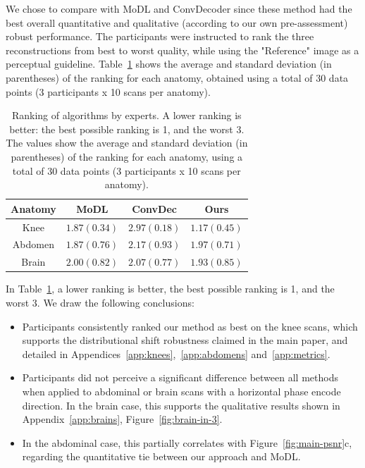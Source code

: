 \documentclass{article}
\begin{document}
We chose to compare with MoDL and ConvDecoder since these method had the best overall quantitative and qualitative (according to our own pre-assessment) robust performance. The participants were instructed to rank the three reconstructions from best to worst quality, while using the "Reference" image as a perceptual guideline. Table~\ref{tab:radiologist-scores} shows the average and standard deviation (in parentheses) of the ranking for each anatomy, obtained using a total of 30 data points (3 participants x 10 scans per anatomy).
\begin{table}
    \centering
    \begin{tabular}{|c|c|c|c|}
        \hline
        Anatomy & MoDL & ConvDec & Ours \\
        \hline
        Knee	& $1.87 (0.34)$ & $2.97 (0.18)$	& $1.17 (0.45)$ \\
        Abdomen & $1.87 (0.76)$ & $2.17 (0.93)$ & $1.97 (0.71)$ \\
        Brain	& $2.00 (0.82)$ & $2.07 (0.77)$ & $1.93 (0.85)$ \\
        \hline
    \end{tabular}
    \caption{Ranking of algorithms by experts. A lower ranking is better: the best possible ranking is 1, and the worst 3. The values show the average and standard deviation (in parentheses) of the ranking for each anatomy, using a total of 30 data points (3 participants x 10 scans per anatomy).}
    \label{tab:radiologist-scores}
\end{table}

In Table~\ref{tab:radiologist-scores}, a lower ranking is better, the best possible ranking is 1, and the worst 3. We draw the following conclusions:
\begin{itemize}
    \item Participants consistently ranked our method as best on the knee scans, which supports the distributional shift robustness claimed in the main paper, and detailed in Appendices~\ref{app:knees},~\ref{app:abdomens} and~\ref{app:metrics}.
    \item Participants did not perceive a significant difference between all methods when applied to abdominal or brain scans with a horizontal phase encode direction. In the brain case, this supports the qualitative results shown in Appendix~\ref{app:brains}, Figure~\ref{fig:brain-in-3}.
    \item In the abdominal case, this partially correlates with Figure~\ref{fig:main-psnr}c, regarding the quantitative tie between our approach and MoDL.
\end{itemize}
\end{document}
